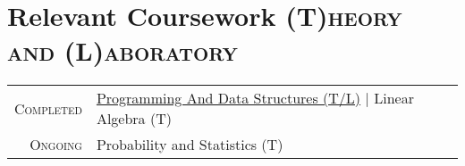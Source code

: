 \documentclass[a4paper,10pt]{extarticle} %
\begin{document}
 \vspace{+0.2cm}
 \section{\textcolor{primary}{Relevant Coursework}
 \hfill\small\textsc{(T)heory and (L)aboratory}}
 \vspace{+0.1cm}

 \begin{tabular}{r|p{15cm}}
 \textsc{Completed} & \href{https://github.com/proffapt/iitkgp-pds-lab }{Programming And Data Structures (T/L)} | Linear Algebra (T) \\
 \textsc{Ongoing} & Probability and Statistics (T)
 \end{tabular}
\end{document}
